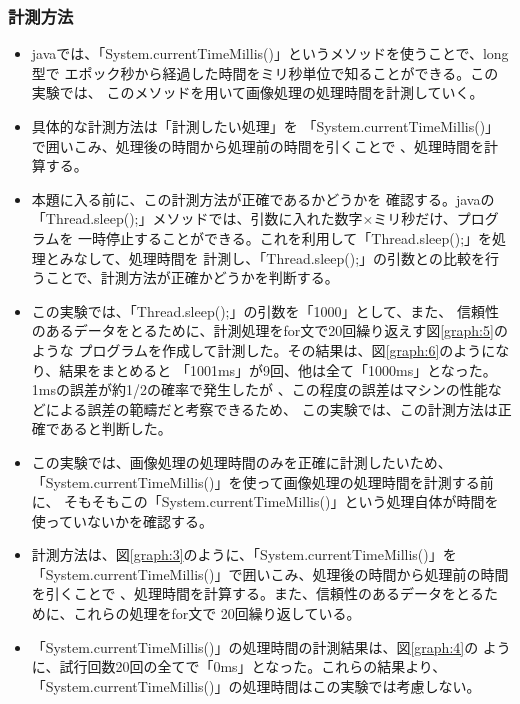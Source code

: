 \subsubsection{計測方法}
\begin{itemize}
  \item javaでは、「System.currentTimeMillis()」というメソッドを使うことで、long型で
  エポック秒から経過した時間をミリ秒単位で知ることができる。この実験では、
  このメソッドを用いて画像処理の処理時間を計測していく。
  \item 具体的な計測方法は「計測したい処理」を
  「System.currentTimeMillis()」で囲いこみ、処理後の時間から処理前の時間を引くことで
  、処理時間を計算する。
  \item 本題に入る前に、この計測方法が正確であるかどうかを
  確認する。javaの「Thread.sleep();」メソッドでは、引数に入れた数字×ミリ秒だけ、プログラムを
  一時停止することができる。これを利用して「Thread.sleep();」を処理とみなして、処理時間を
  計測し、「Thread.sleep();」の引数との比較を行うことで、計測方法が正確かどうかを判断する。
  \item この実験では、「Thread.sleep();」の引数を「1000」として、また、
  信頼性のあるデータをとるために、計測処理をfor文で20回繰り返えす図\ref{graph:5}のような
  プログラムを作成して計測した。その結果は、図\ref{graph:6}のようになり、結果をまとめると
  「1001ms」が9回、他は全て「1000ms」となった。1msの誤差が約1/2の確率で発生したが
  、この程度の誤差はマシンの性能などによる誤差の範疇だと考察できるため、
  この実験では、この計測方法は正確であると判断した。
  \item この実験では、画像処理の処理時間のみを正確に計測したいため、
  「System.currentTimeMillis()」を使って画像処理の処理時間を計測する前に、
  そもそもこの「System.currentTimeMillis()」という処理自体が時間を使っていないかを確認する。
  \item 計測方法は、図\ref{graph:3}のように、「System.currentTimeMillis()」を
  「System.currentTimeMillis()」で囲いこみ、処理後の時間から処理前の時間を引くことで
  、処理時間を計算する。また、信頼性のあるデータをとるために、これらの処理をfor文で
  20回繰り返している。
  \item 「System.currentTimeMillis()」の処理時間の計測結果は、図\ref{graph:4}の
  ように、試行回数20回の全てで「0ms」となった。これらの結果より、
  「System.currentTimeMillis()」の処理時間はこの実験では考慮しない。
  

\end{itemize}
